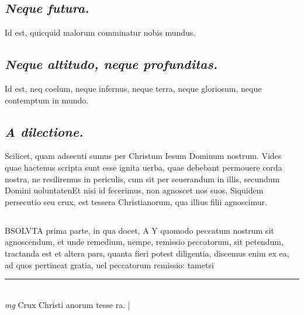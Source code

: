 \documentclass{article}
\begin{document}
\begin{pages}
\subsection*{\textit{Neque futura. }}\pstart Id est, quicquid malorum comminatur nobis mundus.   \pend
{}
{}
\subsection*{\textit{Neque altitudo, neque profunditas. }}\pstart Id est, neq coelum, neque infernus, neque terra, neque gloriosum, neque contemptum in mundo.   \pend
{}
{}
\subsection*{\textit{A dilectione. }}\pstart Scilicet, quam adsecuti sumus per Christum Iesum Dominum nostrum. Vides quae hactenus scripta sunt esse ignita uerba, quae debebant permouere corda nostra, ne resiliremus in periculis, cum sit per seuerandum in illis, secundum Domini uoluntatenEt nisi id fecerimus, non agnoscet nos suos. Siquidem persecutio seu crux, est tessera Christianorum, qua illius filii agnoscimur.   \pend
{}
{}
\subsection*{\textit{}}\pstart BSOLVTA prima parte, in qua docet, A Y quomodo peccatum nostrum sit agnoscendum, et unde remedium, nempe, remissio peccatorum, sit petendum, tractanda est et altera pars, quanta fieri potest diligentia, discemus enim ex ea, ad quos pertineat gratia, uel peccatorum remissio: tametsi  \pend
\vspace{0.5cm}\noindent
\vspace{0.2cm}\rule{1cm}{0.2pt}\\ 
\hspace{0.2cm}\textit{mg}
\footnotesize Crux Christi anorum tesse ra.  
\normalsize| 

\end{pages}
\end{document}
